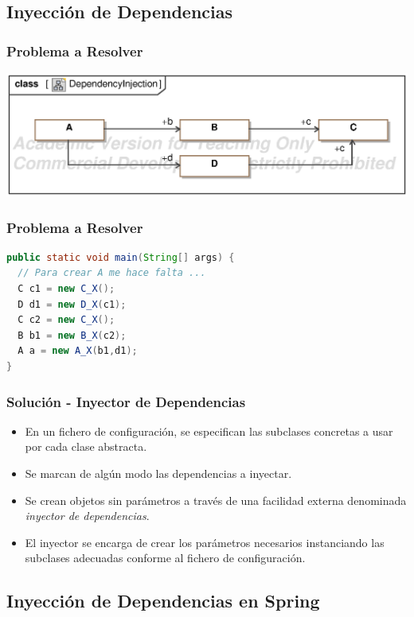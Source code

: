 \documentclass[handout,a4paper,t,xcolor=pst,dvips,colortheme]{beamer}
\begin{document}
\subsection{Inyección de Dependencias}

\begin{frame}[c]
	\frametitle{Problema a Resolver}
	\begin{center}
        \includegraphics[width=\linewidth,keepaspectratio=true]{images/iod/DependencyInjection.eps}
	\end{center}
\end{frame}

\begin{frame}[c,fragile]
	\frametitle{Problema a Resolver}
\begin{lstlisting}[basicstyle=\footnotesize,language=Java]
public static void main(String[] args) {
  // Para crear A me hace falta ...
  C c1 = new C_X();
  D d1 = new D_X(c1);
  C c2 = new C_X();
  B b1 = new B_X(c2);
  A a = new A_X(b1,d1);
}
\end{lstlisting}
\end{frame}

\begin{frame}[c]
	\frametitle{Solución - Inyector de Dependencias}
    \begin{itemize}[<+->]
        \item En un fichero de configuración, se especifican las subclases concretas a usar por cada clase abstracta.
        \item Se marcan de algún modo las dependencias a inyectar.
        \item Se crean objetos \alert{sin parámetros} a través de una facilidad externa denominada \emph{inyector de dependencias}.
        \item El inyector se encarga de crear los parámetros necesarios instanciando las subclases adecuadas conforme al fichero de configuración.
    \end{itemize}
\end{frame}

\subsection{Inyección de Dependencias en Spring}
\end{document}
